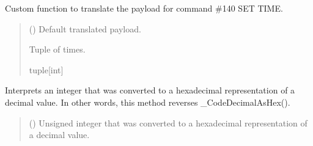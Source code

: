 \documentclass[letterpaper,10pt,english]{sphinxmanual}
\begin{document}
\begin{fulllineitems}
\begin{fulllineitems}
\label{\detokenize{PodApi.Devices:PodApi.Devices.PodDevice_8229.Pod8229._Custom140SETTIME}}
\pysigstartsignatures
{}
\pysigstopsignatures
\sphinxAtStartPar
Custom function to translate the payload for command \#140 SET TIME.
\begin{quote}\begin{description}
\sphinxAtStartPar
{} (\sphinxstyleliteralemphasis{\sphinxupquote{{[}}}\sphinxstyleliteralemphasis{\sphinxupquote{{]}}}) \textendash{} Default translated payload.

\sphinxAtStartPar
Tuple of times.

\sphinxAtStartPar
tuple{[}int{]}

\end{description}\end{quote}

\end{fulllineitems}


\begin{fulllineitems}
\label{\detokenize{PodApi.Devices:PodApi.Devices.PodDevice_8229.Pod8229._DecodeDecimalAsHex}}
\pysigstartsignatures
{}
\pysigstopsignatures
\sphinxAtStartPar
Interprets an integer that was converted to a hexadecimal representation of a         decimal value. In other words, this method reverses \_CodeDecimalAsHex().
\begin{quote}\begin{description}
\sphinxAtStartPar
{} () \textendash{} Unsigned integer that was converted to a hexadecimal representation of a                 decimal value.


\end{description}
\end{quote}
\end{fulllineitems}
\end{fulllineitems}
\end{document}
